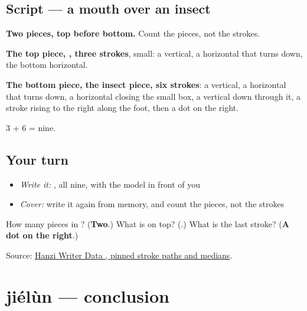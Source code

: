 \subsection*{Script — a mouth over an insect}

\begin{quote}
\end{quote}

\textbf{Two pieces, top before bottom.} Count the pieces, not the strokes.

\textbf{The top piece, , three strokes}, small: a vertical, a horizontal that turns down, the bottom horizontal.

\textbf{The bottom piece, the insect piece, six strokes}: a vertical, a horizontal that turns down, a horizontal closing the small box, a vertical down through it, a stroke rising to the right along the foot, then a dot on the right.

3 + 6 = nine.

\subsection*{Your turn}
\begin{itemize}
\raggedright
  \item \emph{Write it:} , all nine, with the model in front of you
  \item \emph{Cover:} write it again from memory, and count the pieces, not the strokes
\end{itemize}

\begin{tcolorbox}[breakable,colback=teal!4,colframe=teal!35!black,title={Before you move on}]
How many pieces in ? (\textbf{Two}.) What is on top? (\textbf{}.) What is the last stroke? (\textbf{A dot on the right}.)

Source: \href{https://raw.githubusercontent.com/chanind/hanzi-writer-data/68d10a4b21150cae5e1ebbd223eed289cf32d90c/data/\%E8\%99\%BD.json}{Hanzi Writer Data , pinned stroke paths and medians}.
\end{tcolorbox}
\section[jiélùn]{jiélùn — conclusion}

\label{lesson:ZH-C371-jielun}



